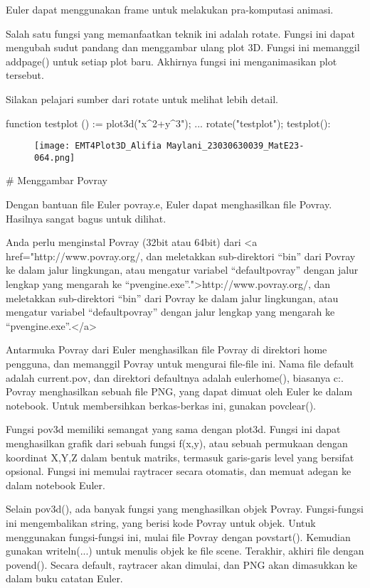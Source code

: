 \documentclass{article}
\begin{document}
Euler dapat menggunakan frame untuk melakukan pra-komputasi animasi.


Salah satu fungsi yang memanfaatkan teknik ini adalah rotate. Fungsi
ini dapat mengubah sudut pandang dan menggambar ulang plot 3D. Fungsi
ini memanggil addpage() untuk setiap plot baru. Akhirnya fungsi ini
menganimasikan plot tersebut.


Silakan pelajari sumber dari rotate untuk melihat lebih detail.


\>function testplot () := plot3d("x^2+y^3"); ...  
\>   rotate("testplot"); testplot():


\begin{figure}
    \centering
    \texttt{[image: EMT4Plot3D\_Alifia Maylani\_23030630039\_MatE23-064.png]}
    \caption{}
    \label{fig:enter-label}
\end{figure}

# Menggambar Povray

Dengan bantuan file Euler povray.e, Euler dapat menghasilkan file
Povray. Hasilnya sangat bagus untuk dilihat.


Anda perlu menginstal Povray (32bit atau 64bit) dari
  <a href="http://www.povray.org/, dan meletakkan sub-direktori “bin” dari Povray ke dalam jalur lingkungan, atau mengatur variabel “defaultpovray” dengan jalur lengkap yang mengarah ke “pvengine.exe”.">http://www.povray.org/, dan meletakkan sub-direktori “bin” dari Povray ke dalam jalur lingkungan, atau mengatur variabel “defaultpovray” dengan jalur lengkap yang mengarah ke “pvengine.exe”.</a>


Antarmuka Povray dari Euler menghasilkan file Povray di direktori home
pengguna, dan memanggil Povray untuk mengurai file-file ini. Nama file
default adalah current.pov, dan direktori defaultnya adalah
eulerhome(), biasanya c:\Users\Username\Euler. Povray menghasilkan
sebuah file PNG, yang dapat dimuat oleh Euler ke dalam notebook. Untuk
membersihkan berkas-berkas ini, gunakan povclear().


Fungsi pov3d memiliki semangat yang sama dengan plot3d. Fungsi ini
dapat menghasilkan grafik dari sebuah fungsi f(x,y), atau sebuah
permukaan dengan koordinat X,Y,Z dalam bentuk matriks, termasuk
garis-garis level yang bersifat opsional. Fungsi ini memulai raytracer
secara otomatis, dan memuat adegan ke dalam notebook Euler.


Selain pov3d(), ada banyak fungsi yang menghasilkan objek Povray.
Fungsi-fungsi ini mengembalikan string, yang berisi kode Povray untuk
objek. Untuk menggunakan fungsi-fungsi ini, mulai file Povray dengan
povstart(). Kemudian gunakan writeln(...) untuk menulis objek ke file
scene. Terakhir, akhiri file dengan povend(). Secara default,
raytracer akan dimulai, dan PNG akan dimasukkan ke dalam buku catatan
Euler.
\end{document}
